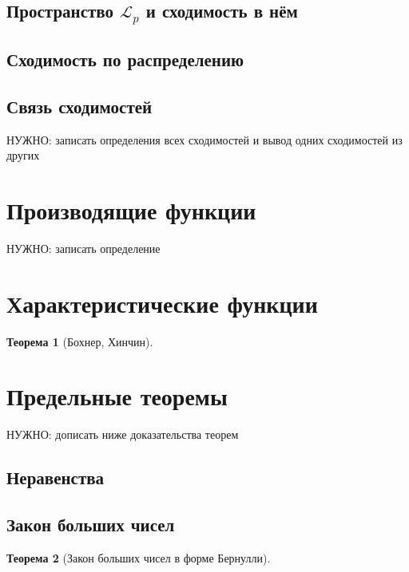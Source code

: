 \documentclass[12pt]{article}
\newtheorem{theorem}{Теорема}
\numberwithin{theorem}{section}
\theoremstyle{definition}
\newcommand{\TODO}[1]{\textcolor{todocolor}{НУЖНО: #1}}
\begin{document}
	\subsection{Пространство $ \mathcal{L}_p $ и сходимость в нём}
	
	\subsection{Сходимость по распределению}
	
	\subsection{Связь сходимостей}
	
	\TODO{записать определения всех сходимостей и вывод одних сходимостей из других}
	
	\section{Производящие функции}
	
	\TODO{записать определение}
	
	\section{Характеристические функции}
	
	\begin{theorem}[Бохнер, Хинчин]
		
	\end{theorem}
	
	\section{Предельные теоремы}
	
	\TODO{дописать ниже доказательства теорем}
	
	\subsection{Неравенства}
	
	\subsection{Закон больших чисел}
	
	\begin{theorem}[Закон больших чисел в форме Бернулли]
		
	\end{theorem}
	
\end{document}
